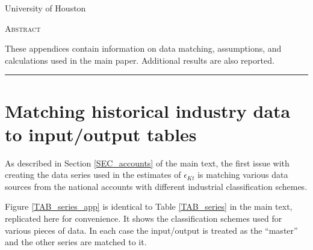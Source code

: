 \documentclass[11pt]{article}
\begin{document}
\begin{titlepage}
\vspace{2in} \noindent {\large \today}

\vspace{.5in} 

\vspace{.25in} 

\vspace{.05in} \noindent University of Houston

\vfill \noindent \textsc{Abstract} \hrulefill

\vspace{.05in} \noindent These appendices contain information on data matching, assumptions, and calculations used in the main paper. Additional results are also reported.
 
\vspace{.1in} \hrule

\vspace{.1in} 
\end{titlepage}

\pagebreak 

\tableofcontents
\listoffigures
\listoftables

\section{Matching historical industry data to input/output tables}
As described in Section \ref{SEC_accounts} of the main text, the first issue with creating the data series used in the estimates of $\epsilon_{Kt}$ is matching various data sources from the national accounts with different industrial classification schemes. 

Figure \ref{TAB_series_app} is identical to Table \ref{TAB_series} in the main text, replicated here for convenience. It shows the classification schemes used for various pieces of data. In each case the input/output is treated as the ``master'' and the other series are matched to it. 
\end{document}
